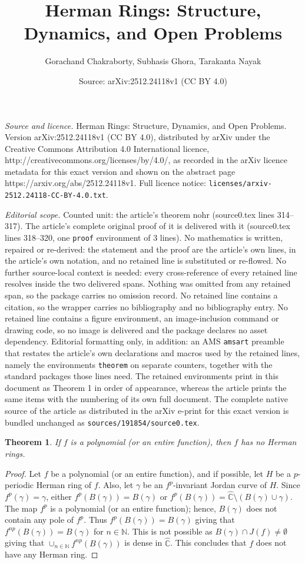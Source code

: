 \documentclass[10pt,a4paper]{amsart}
\title{Herman Rings: Structure, Dynamics, and Open Problems}
\author{Gorachand Chakraborty, Subhasis Ghora, Tarakanta Nayak}
\date{Source: arXiv:2512.24118v1 (CC BY 4.0)}
\newtheorem{theorem}{Theorem}
\begin{document}
\maketitle

\noindent\emph{Source and licence.} Herman Rings: Structure, Dynamics, and Open Problems. Version arXiv:2512.24118v1 (CC BY 4.0), distributed by arXiv under the Creative Commons Attribution 4.0 International licence, http://creativecommons.org/licenses/by/4.0/, as recorded in the arXiv licence metadata for this exact version and shown on the abstract page https://arxiv.org/abs/2512.24118v1. Full licence notice: \texttt{licenses/arxiv-2512.24118-CC-BY-4.0.txt}.\par\smallskip

\noindent\textit{Editorial scope.} Counted unit: the article's theorem nohr (source0.tex lines 314--317). The article's complete original proof of it is delivered with it (source0.tex lines 318--320, one \texttt{proof} environment of 3 lines). No mathematics is written, repaired or re-derived: the statement and the proof are the article's own lines, in the article's own notation, and no retained line is substituted or re-flowed.  No further source-local context is needed: every cross-reference of every retained line resolves inside the two delivered spans.  Nothing was omitted from any retained span, so the package carries no omission record.  No retained line contains a citation, so the wrapper carries no bibliography and no bibliography entry.  No retained line contains a figure environment, an image-inclusion command or drawing code, so no image is delivered and the package declares no asset dependency.  Editorial formatting only, in addition: an AMS \texttt{amsart} preamble that restates the article's own declarations and macros used by the retained lines, namely the environments \texttt{theorem} on separate counters, together with the standard packages those lines need.  The retained environments print in this document as Theorem 1 in order of appearance, whereas the article prints the same items with the numbering of its own full document.  The complete native source of the article as distributed in the arXiv e-print for this exact version is bundled unchanged as \texttt{sources/191854/source0.tex}.
\begin{theorem}
\label{nohr}
    If $f$ is a polynomial (or an entire function), then $f$ has no Herman rings.
\end{theorem}

\begin{proof}
    Let $f$ be a polynomial (or an entire function), and if possible, let $H$ be a $p$-periodic Herman ring of $f$. Also, let $\gamma$ be an $f^p$-invariant Jordan curve of $H$. Since $f^p(\gamma)=\gamma$, either $f^p(B(\gamma))=B(\gamma)$ or $f^p(B(\gamma))=\widehat{\mathbb{C}}\setminus (B(\gamma)\cup \gamma)$. The map  $f^p$ is a polynomial (or an entire function); hence, $B(\gamma)$ does not contain any pole of $f^p$. Thus $f^p(B(\gamma))=B(\gamma)$ giving that $f^{np}(B(\gamma))=B(\gamma)$ for $n\in \mathbb{N}$. This is not possible as $B(\gamma)\cap J(f)\neq \emptyset$ giving that $\cup_{n\in \mathbb{N}}f^{np}(B(\gamma))$ is dense in $\widehat{\mathbb{C}}$. This concludes that $f$ does not have any Herman ring. 
\end{proof}
\end{document}
